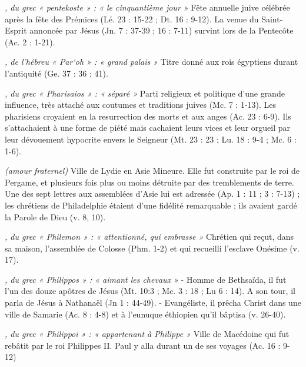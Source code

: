 \begin{multicols}{2}
\textit{, du grec « pentekoste » : « le cinquantième jour »}\newline
Fête annuelle juive célébrée après la fête des Prémices (Lé. 23 : 15-22 ; Dt. 16 : 9-12). La venue du Saint-Esprit annoncée par Jésus (Jn. 7 : 37-39 ; 16 : 7-11) survint lors de la Pentecôte (Ac. 2 : 1-21).

\textit{, de l'hébreu « Par`oh » : « grand palais »}\newline
Titre donné aux rois égyptiens durant l'antiquité (Ge. 37 : 36 ; 41).

\textit{, du grec « Pharisaios » : « séparé »}\newline
Parti religieux et politique d'une grande influence, très attaché aux coutumes et traditions juives (Mc. 7 : 1-13). Les pharisiens croyaient en la resurrection des morts et aux anges (Ac. 23 : 6-9). Ils s'attachaient à une forme de piété mais cachaient leurs vices et leur orgueil par leur dévouement hypocrite envers le Seigneur (Mt. 23 : 23 ; Lu. 18 : 9-4 ; Mc. 6 : 1-6).

\textit{(amour fraternel)}\newline
Ville de Lydie en Asie Mineure. Elle fut construite par le roi de Pergame, et plusieurs fois plus ou moins détruite par des tremblements de terre. Une des sept lettres aux assemblées d'Asie lui est adressée (Ap. 1 : 11 ; 3 : 7-13) ; les chrétiens de Philadelphie étaient d'une fidélité remarquable ; ils avaient gardé la Parole de Dieu (v. 8, 10).

\textit{, du grec « Philemon » : « attentionné, qui embrasse »}\newline
Chrétien qui reçut, dans sa maison, l'assemblée de Colosse (Phm. 1-2) et qui recueilli l'esclave Onésime (v. 17).

\textit{, du grec « Philippos » : « aimant les chevaux »}\newline
- Homme de Bethsaïda, il fut l'un des douze apôtres de Jésus (Mt. 10:3 ; Mc. 3 : 18 ; Lu 6 : 14). A son tour, il parla de Jésus à Nathanaël (Jn 1 : 44-49).
- Evangéliste, il prêcha Christ dans une ville de Samarie (Ac. 8 : 4-8) et à l'eunuque éthiopien qu'il bâptisa (v. 26-40).

\textit{, du grec « Philippoi » : « appartenant à Philippe »}\newline
Ville de Macédoine qui fut rebâtit par le roi Philippes II. Paul y alla durant un de ses voyages (Ac. 16 : 9-12)


\end{multicols}
